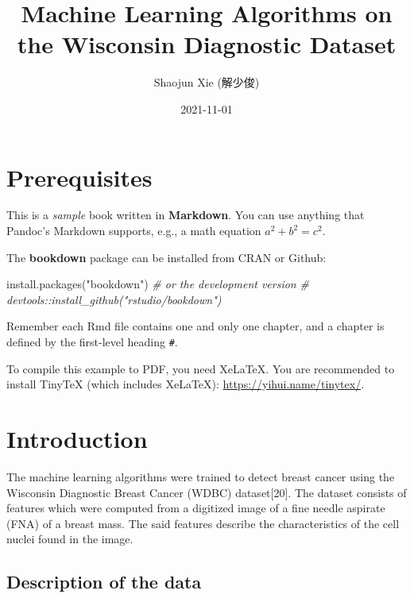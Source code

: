 \documentclass[
]{book}
\title{Machine Learning Algorithms on the Wisconsin Diagnostic Dataset}
\author{Shaojun Xie (解少俊)}
\date{2021-11-01}
\newenvironment{Shaded}{\begin{snugshade}}{\end{snugshade}}
\newcommand{\CommentTok}[1]{\textcolor[rgb]{0.56,0.35,0.01}{\textit{#1}}}
\newcommand{\FunctionTok}[1]{\textcolor[rgb]{0.00,0.00,0.00}{#1}}
\newcommand{\NormalTok}[1]{#1}
\newcommand{\StringTok}[1]{\textcolor[rgb]{0.31,0.60,0.02}{#1}}
\begin{document}
\maketitle

{
\setcounter{tocdepth}{1}
\tableofcontents
}
\hypertarget{prerequisites}{%
\chapter{Prerequisites}\label{prerequisites}}

This is a \emph{sample} book written in \textbf{Markdown}. You can use anything that Pandoc's Markdown supports, e.g., a math equation \(a^2 + b^2 = c^2\).

The \textbf{bookdown} package can be installed from CRAN or Github:

\begin{Shaded}
\begin{Highlighting}[]
\FunctionTok{install.packages}\NormalTok{(}\StringTok{"bookdown"}\NormalTok{)}
\CommentTok{\# or the development version}
\CommentTok{\# devtools::install\_github("rstudio/bookdown")}
\end{Highlighting}
\end{Shaded}

Remember each Rmd file contains one and only one chapter, and a chapter is defined by the first-level heading \texttt{\#}.

To compile this example to PDF, you need XeLaTeX. You are recommended to install TinyTeX (which includes XeLaTeX): \url{https://yihui.name/tinytex/}.

\hypertarget{intro}{%
\chapter{Introduction}\label{intro}}

The machine learning algorithms were trained to detect breast
cancer using the Wisconsin Diagnostic Breast Cancer (WDBC)
dataset{[}20{]}. The dataset consists of features which
were computed from a digitized image of a fine needle aspirate
(FNA) of a breast mass. The said features describe the characteristics
of the cell nuclei found in the image.

\hypertarget{description-of-the-data}{%
\section{Description of the data}\label{description-of-the-data}}
\end{document}
